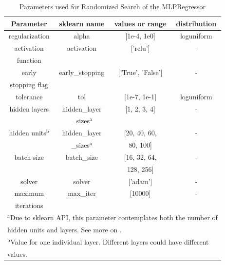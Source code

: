 \documentclass[conference]{IEEEtran}
\begin{document}
\begin{table}[htbp]
\caption{Parameters used for Randomized Search of the MLPRegressor}
\begin{center}
\begin{tabular}{|c|c|c|c|}
\hline
\textbf{Parameter}&{\textbf{sklearn name}} &{\textbf{ values or range}}&{\textbf{distribution}}  \\
\hline
regularization              & alpha                               & [1e-4, 1e0]       & loguniform \\
\hline
activation                  & activation                          & ['relu']          & - \\
function&&&\\
\hline
early                       & early\_stopping                     & ['True', 'False'] & - \\
stopping flag&&&\\
\hline
tolerance                   & tol                                 & [1e-7, 1e-1]      & loguniform \\
\hline
hidden layers               & hidden\_layer & [1, 2, 3, 4]      & -  \\
&\_sizes$^{\mathrm{a}}$&&\\
\hline
hidden units$^{\mathrm{b}}$ & hidden\_layer & [20, 40, 60,      & -  \\
&\_sizes$^{\mathrm{a}}$&80, 100]&\\
\hline
batch size                  & batch\_size                         & [16, 32, 64,      & -  \\
&& 128, 256]&\\
\hline
solver                      & solver                              & ['adam']          & -  \\
\hline
maximum                     & max\_iter                           & [10000]           & -  \\
iterations&&&\\
\hline
\multicolumn{4}{l}{$^{\mathrm{a}}$Due to sklearn API, this parameter contemplates both the number of} \\
\multicolumn{4}{l}{hidden units and layers. See more on \cite{sklearn_manual}.}\\
\multicolumn{4}{l}{$^{\mathrm{b}}$Value for one individual layer. Different layers could have different} \\
\multicolumn{4}{l}{values.}
\end{tabular}
\label{mlp_rdmsearch}
\end{center}
\end{table}
\end{document}
